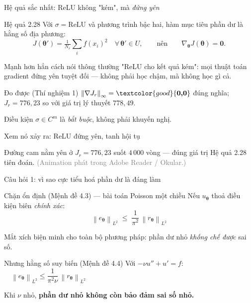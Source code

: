 \documentclass[aspectratio=169,11pt]{beamer}
\newcommand{\hoathinh}[2][0.62\textheight]{%
  \animategraphics[height=#1,controls=play,loop,autoplay]{10}{anim/#2}{}{}}
\newcommand{\btheta}{\bm{\theta}}
\newcommand{\norm}[1]{\left\lVert #1 \right\rVert}
\newcommand{\good}[1]{\textcolor{good}{\textbf{#1}}}
\newcommand{\bad}[1]{\textcolor{bad}{\textbf{#1}}}
\begin{document}
\begin{frame}{Hệ quả sắc nhất: ReLU không "kém", mà \emph{đứng yên}}
\begin{alertblock}{Hệ quả 2.28}
Với $\sigma = \mathrm{ReLU}$ và phương trình bậc hai, hàm mục tiêu phần dư là
\alert{hằng số địa phương}:
\[
J(\btheta') = \tfrac{1}{N_r}\textstyle\sum_i f(x_i)^2
\quad \forall\,\btheta' \in U,
\qquad\text{nên}\qquad \nabla_{\btheta}J(\btheta) = \bm{0}.
\]
\end{alertblock}

\medskip
Mạnh hơn hẳn cách nói thông thường "ReLU cho kết quả kém": mọi thuật toán gradient
đứng yên \alert{tuyệt đối} --- không phải học chậm, mà không học gì cả.

\medskip
\begin{block}{Đo được (Thí nghiệm 1)}
$\norm{\nabla J_r}_\infty = \good{0{,}0}$ đúng nghĩa;
$J_r = 776{,}23$ so với giá trị lý thuyết $778{,}49$.

\smallskip
\footnotesize Điều kiện $\sigma \in C^m$ là \emph{bắt buộc}, không phải khuyến nghị.
\end{block}
\end{frame}

\begin{frame}{Xem nó xảy ra: ReLU đứng yên, tanh hội tụ}
\centering
\hoathinh{tn1_relu_vs_tanh}

\medskip
\footnotesize Đường cam nằm yên ở $J_r = 776{,}23$ suốt $4\,000$ vòng ---
đúng giá trị Hệ quả 2.28 tiên đoán. \textcolor{gray}{(Animation phát trong
Adobe Reader / Okular.)}
\end{frame}

\begin{frame}{Câu hỏi 1: vì sao cực tiểu hoá phần dư là đáng làm}
\begin{block}{Chặn ổn định (Mệnh đề 4.3) --- bài toán Poisson một chiều}
Nếu $u_{\btheta}$ thoả điều kiện biên \emph{chính xác}:
\[
\norm{e_{\btheta}}_{L^2} \;\le\; \frac{1}{\pi^{2}}\,\norm{r_{\btheta}}_{L^2}
\]
\end{block}

Mắt xích biện minh cho toàn bộ phương pháp: phần dư nhỏ \emph{khống chế được} sai số.

\medskip
\begin{alertblock}{Nhưng hằng số suy biến (Mệnh đề 4.4)}
Với $-\nu u'' + u' = f$:
$\quad\norm{e_{\btheta}}_{L^2} \le \dfrac{1}{\pi^{2}\nu}\,\norm{r_{\btheta}}_{L^2}$

\smallskip
Khi $\nu$ nhỏ, \bad{phần dư nhỏ không còn bảo đảm sai số nhỏ.}
\end{alertblock}
\end{frame}
\end{document}
